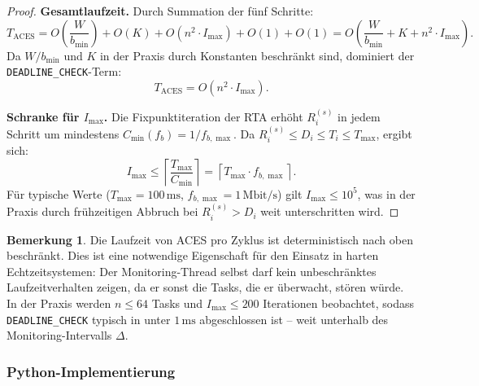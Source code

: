 ﻿\documentclass[a4paper,12pt]{article}
\theoremstyle{definition}
\newtheorem{bemerkung}{Bemerkung}
\begin{document}
\begin{proof}
\textbf{Gesamtlaufzeit.}
Durch Summation der f\"{u}nf Schritte:
\[
    T_{\mathrm{ACES}}
    = O\!\left(\frac{W}{b_{\min}}\right) + O(K) + O(n^2 \cdot I_{\max}) + O(1) + O(1)
    = O\!\left(\frac{W}{b_{\min}} + K + n^2 \cdot I_{\max}\right).
\]
Da $W / b_{\min}$ und $K$ in der Praxis durch Konstanten beschr\"{a}nkt sind,
dominiert der \texttt{DEADLINE\_CHECK}-Term:
\[
    T_{\mathrm{ACES}} = O(n^2 \cdot I_{\max}).
\]

\textbf{Schranke f\"{u}r $I_{\max}$.}
Die Fixpunktiteration der RTA erh\"{o}ht $R_i^{(s)}$ in jedem Schritt um mindestens
$C_{\min}(f_b) = 1 / f_{b,\max}$.
Da $R_i^{(s)} \leq D_i \leq T_i \leq T_{\max}$, ergibt sich:
\[
    I_{\max} \leq \left\lceil \frac{T_{\max}}{C_{\min}} \right\rceil
    = \left\lceil T_{\max} \cdot f_{b,\max} \right\rceil.
\]
F\"{u}r typische Werte ($T_{\max} = 100\,\text{ms}$, $f_{b,\max} = 1\,\text{Mbit/s}$)
gilt $I_{\max} \leq 10^5$, was in der Praxis durch fr\"{u}hzeitigen Abbruch
bei $R_i^{(s)} > D_i$ weit unterschritten wird.
\end{proof}

\begin{bemerkung}
Die Laufzeit von ACES pro Zyklus ist deterministisch nach oben beschr\"{a}nkt.
Dies ist eine notwendige Eigenschaft f\"{u}r den Einsatz in harten Echtzeitsystemen:
Der Monitoring-Thread selbst darf kein unbeschr\"{a}nktes Laufzeitverhalten zeigen,
da er sonst die Tasks, die er \"{u}berwacht, st\"{o}ren w\"{u}rde.
In der Praxis werden $n \leq 64$ Tasks und $I_{\max} \leq 200$ Iterationen
beobachtet, sodass \texttt{DEADLINE\_CHECK} typisch in unter $1\,\text{ms}$
abgeschlossen ist -- weit unterhalb des Monitoring-Intervalls $\Delta$.
\end{bemerkung}

\subsubsection{Python-Implementierung}
\end{document}
